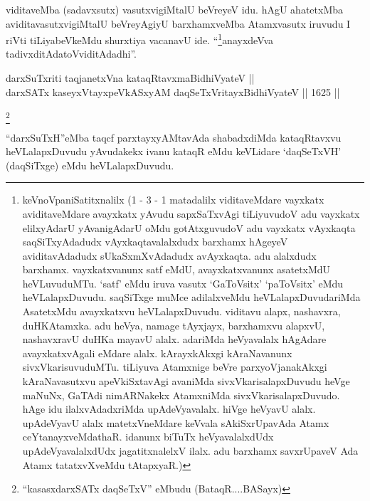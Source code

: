 \begin{artha}
viditaveMba (sadavxsutx) vasutxvigiMtalU beVreyeV idu. hAgU ahatetxMba aviditavasutxvigiMtalU beVreyAgiyU barxhamxveMba Atamxvasutx iruvudu I riVti tiLiyabeVkeMdu shurxtiya vacanavU ide. ``\footnote{keVnoVpaniSatitxnalilx (1 - 3 - 1 matadalilx viditaveMdare vayxkatx aviditaveMdare avayxkatx yAvudu sapxSaTxvAgi tiLiyuvudoV adu vayxkatx elilxyAdarU yAvanigAdarU oMdu gotAtxguvudoV adu vayxkatx vAyxkaqta saqSiTxyAdadudx vAyxkaqtavalalxdudx barxhamx hAgeyeV aviditavAdadudx sUkaSxmXvAdadudx avAyxkaqta. adu alalxdudx barxhamx. vayxkatxvanunx satf eMdU, avayxkatxvanunx asatetxMdU heVLuvuduMTu. `satf' eMdu iruva vasutx `GaToV\s sitx' `paToV\s sitx' eMdu heVLalapxDuvudu. saqSiTxge muMce adilalxveMdu heVLalapxDuvudariMda AsatetxMdu avayxkatxvu heVLalapxDuvudu. viditavu alapx, nashavxra, duHKAtamxka. adu heVya, namage tAyxjayx, barxhamxvu alapxvU, nashavxravU duHKa mayavU alalx. adariMda heVyavalalx hAgAdare avayxkatxvAgali eMdare alalx. kArayxkAkxgi kAraNavanunx sivxVkarisuvuduMTu. tiLiyuva Atamxnige beVre parxyoVjanakAkxgi kAraNavasutxvu apeVkiSxtavAgi avaniMda sivxVkarisalapxDuvudu heVge maNuNx, GaTAdi nimARNakekx AtamxniMda sivxVkarisalapxDuvudo. hAge idu ilalxvAdadxriMda upAdeVyavalalx. hiVge heVyavU alalx. upAdeVyavU alalx matetxVneMdare keVvala sAkiSxrUpavAda Atamx ceYtanayxveMdathaR. idanunx biTuTx heVyavalalxdUdx upAdeVyavalalxdUdx jagatitxnalelxV ilalx. adu barxhamx savxrUpaveV Ada Atamx tatatxvXveMdu tAtapxyaR.)}anayxdeVva tadivxditAdatoV\s viditAdadhi''.
\end{artha}


\begin{shl}
darxSuTxriti \footnotemark[2]taqjanetxVna kataqRtavxmaBidhiVyateV || \\
darxSATx kaseyxVtayxpeVkASxyAM \footnotemark[3]daqSeTxVritayxBidhiVyateV \hfill || 1625 ||  
\end{shl}
\footnote{``kasasxdarxSATx daqSeTxV'' eMbudu (BataqR....BASayx)}

\begin{artha}
``darxSuTxH''eMba taqcf parxtayxyAMtavAda shabadxdiMda kataqRtavxvu heVLalapxDuvudu yAvudakekx ivanu kataqR eMdu keVLidare `daqSeTxVH' (daqSiTxge) eMdu heVLalapxDuvudu.
\end{artha}


